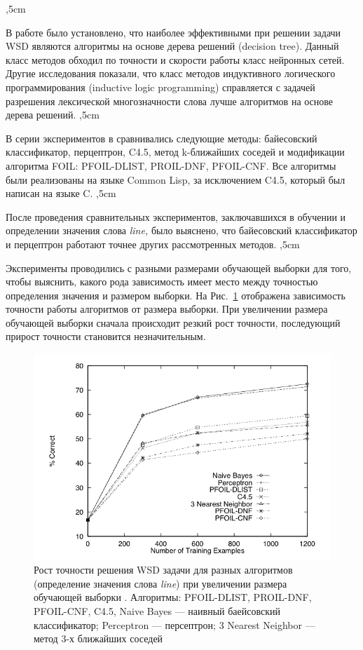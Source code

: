 \documentclass{article}
\begin{document}
\begin{articletext}
,5cm

В работе \cite{Charles 1993} было установлено, что наиболее эффективными при решении задачи WSD являются алгоритмы на основе дерева решений (decision tree). Данный класс методов обходил по точности и скорости работы класс нейронных сетей. Другие исследования \cite{Mooney 1995} показали, что класс методов индуктивного логического программирования (inductive logic programming) справляется с задачей разрешения лексической многозначности слова лучше алгоритмов на основе дерева решений. 
,5cm

В серии экспериментов в \cite{Mooney 1996} сравнивались следующие методы: байесовский классификатор, перцептрон, C4.5, метод k-ближайших соседей и модификации алгоритма FOIL: PFOIL-DLIST, PROIL-DNF, PFOIL-CNF. Все алгоритмы были реализованы на языке Common Lisp, за исключением C4.5, который был написан на языке C.
,5cm

После проведения сравнительных экспериментов, заключавшихся в обучении и определении значения слова \textit{line,} было выяснено, что байесовский классификатор и перцептрон работают точнее других рассмотренных методов. 
,5cm

Эксперименты проводились с разными размерами обучающей выборки для того, чтобы выяснить, какого рода зависимость имеет место между точностью определения значения и размером выборки. На Рис.~\ref{kor1} отображена зависимость точности работы алгоритмов от размера выборки. При увеличении размера обучающей выборки сначала происходит резкий рост точности, последующий прирост точности становится незначительным.

\begin{figure}[H]
\includegraphics[keepaspectratio=true,
 width=0.9\columnwidth]{line_wsd_1_accuracy.png}
\caption{Рост точности решения WSD задачи для разных алгоритмов (определение значения слова \textit{line}) при увеличении размера обучающей выборки \cite{Mooney 1996}. Алгоритмы: PFOIL-DLIST, PROIL-DNF, PFOIL-CNF, C4.5, Naive Bayes --- наивный баейсовский классификатор; Perceptron --- персептрон; 3 Nearest Neighbor --- метод 3-х ближайших соседей}
\label{kor1}
\end{figure}


\end{articletext}
\end{document}
